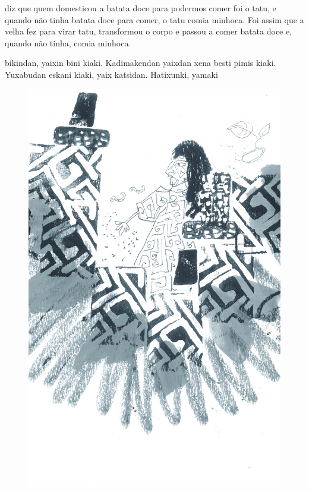 
 diz que quem
domesticou a batata doce para
podermos comer foi o tatu, e
quando não tinha batata doce
para comer, o tatu comia minhoca.
Foi assim que a velha fez para
virar tatu, transformou o corpo
e passou a comer batata doce e,
quando não tinha, comia minhoca.

\vspace{2em}

 bikindan, yaixin bini kiaki.
Kadimakendan yaixdan
xena besti pimis kiaki.
Yuxabudan eskani kiaki, yaix
katsidan. Hatixunki, yamaki

\vspace*{\fill}

\pagebreak
\thispagestyle{empty}
\begin{figure}[H]
\vspace*{-1.6cm}
\hspace*{-2.2cm}\includegraphics[width=138mm]{./imgs/img13.jpg}
\end{figure}



